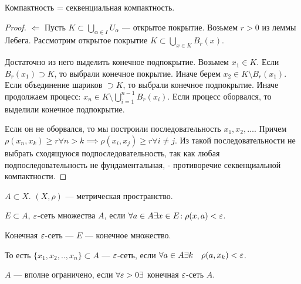 \begin{theorem}
    Компактность = секвенциальная компактность.
\end{theorem}
\begin{proof}
    $\Leftarrow$ Пусть  $K \subset \bigcup\limits_{\alpha \in I} U_\alpha$ --- открытое покрытие. Возьмем $r > 0$ из леммы Лебега. Рассмотрим открытое покрытие  $K \subset \bigcup\limits_{x \in K} B_r(x)$.

    Достаточно из него выделить конечное подпокрытие. Возьмем  $x_1 \in K$. Если $B_r(x_1) \supset K$, то выбрали конечное покрытие. Иначе берем $x_2 \in K \setminus B_r(x_1)$. Если объединение шариков $\supset K$, то выбрали конечное подпокрытие. Иначе продолжаем процесс:  $x_n \in K \setminus \bigcup_{i=1}^{n-1}B_r(x_i)$. Если процесс оборвался, то выделили конечное подпокрытие.

    Если он не оборвался, то мы построили последовательность $x_1, x_2,\ldots$. Причем  $\rho(x_n, x_k) \ge r \forall n > k \implies \rho(x_i, x_j) \ge r \forall i \ne j$. Из такой последовательности не выбрать сходящуюся подпоследовательность, так как любая подпоследовательность не фундаментальная, - противоречие секвенциальной компактности.
\end{proof}
\begin{definition}
    $A \subset X$.  $(X, \rho)$ --- метрическая пространство.

     $E \subset A$,  $\varepsilon$-сеть множества  $A$, если  $\forall a \in A \exists x \in E\!: \rho(x, a) < \varepsilon$.

     Конечная  $\varepsilon$-сеть ---  $E$ --- конечное множество.

     То есть $\{x_1, x_2,.., x_n\} \subset A$ --- $\varepsilon$-сеть, если  $\forall a \in A \exists k\quad \rho(a, x_k) < \varepsilon$.
\end{definition}
\begin{definition}
    $A$ --- вполне ограничено, если  $\forall \varepsilon > 0 \exists$ конечная $\varepsilon$-сеть  $A$.
\end{definition}

